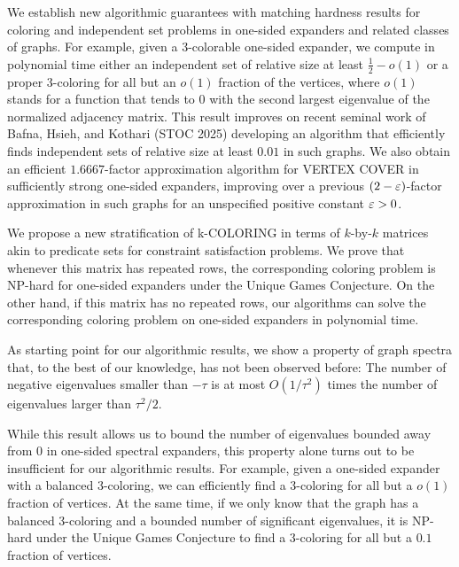 We establish new algorithmic guarantees with matching hardness results for coloring and independent set problems in one-sided expanders and related classes of graphs.
For example, given a \(3\)-colorable one-sided expander, we compute in polynomial time either an independent set of relative size at least \(\tfrac 12 - o(1)\)
or a proper \(3\)-coloring for all but an \(o(1)\) fraction of the vertices,
where \(o(1)\) stands for a function that tends to \(0\) with the second largest eigenvalue of the normalized adjacency matrix.
This result improves on recent seminal work of Bafna, Hsieh, and Kothari (STOC 2025) developing an algorithm that efficiently finds independent sets of relative size at least \(0.01\) in such graphs.
We also obtain an efficient \(1.6667\)-factor approximation algorithm for VERTEX COVER in sufficiently strong one-sided expanders, improving over a previous \((2-\varepsilon)\)-factor approximation in such graphs for an unspecified positive constant \(\varepsilon>0\).

We propose a new stratification of k-COLORING in terms of \(k\)-by-\(k\) matrices akin to predicate sets for constraint satisfaction problems.
We prove that whenever this matrix has repeated rows, the corresponding coloring problem is NP-hard for one-sided expanders under the Unique Games Conjecture.
On the other hand, if this matrix has no repeated rows, our algorithms can solve the corresponding coloring problem on one-sided expanders in polynomial time.

As starting point for our algorithmic results, we show a property of graph spectra that, to the best of our knowledge, has not been observed before:
The number of negative eigenvalues smaller than \(-\tau\) is at most \(O(1/\tau^{2})\) times the number of eigenvalues larger than \(\tau^{2}/2\).

While this result allows us to bound the number of eigenvalues bounded away from \(0\) in one-sided spectral expanders, this property alone turns out to be insufficient for our algorithmic results.
For example, given a one-sided expander with a balanced 3-coloring, we can efficiently find a 3-coloring for all but a \(o(1)\) fraction of vertices.
At the same time, if we only know that the graph has a balanced 3-coloring and a bounded number of significant eigenvalues, it is NP-hard under the Unique Games Conjecture to find a 3-coloring for all but a \(0.1\) fraction of vertices.


